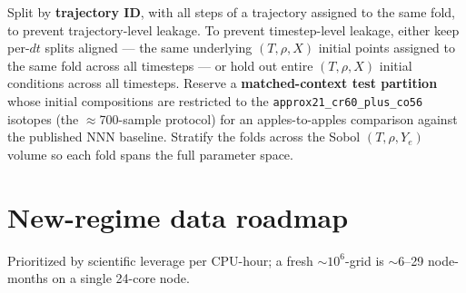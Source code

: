 \documentclass[11pt]{article}
\begin{document}
Split by \textbf{trajectory ID}, with all steps of a trajectory assigned to the same fold, to prevent trajectory-level leakage. To prevent timestep-level leakage, either keep per-$dt$ splits aligned --- the same underlying $(T, \rho, X)$ initial points assigned to the same fold across all timesteps --- or hold out entire $(T, \rho, X)$ initial conditions across all timesteps. Reserve a \textbf{matched-context test partition} whose initial compositions are restricted to the \texttt{approx21\_cr60\_plus\_co56} isotopes (the $\approx$700-sample protocol) for an apples-to-apples comparison against the published NNN baseline. Stratify the folds across the Sobol $(T, \rho, Y_e)$ volume so each fold spans the full parameter space.

\section{New-regime data roadmap}

Prioritized by scientific leverage per CPU-hour; a fresh $\sim 10^6$-grid is $\sim$6--29 node-months on a single 24-core node.
\end{document}
